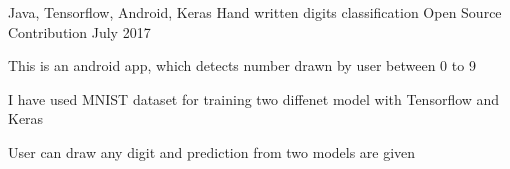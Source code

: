 \begin{cventries}
  \cventry
    {Java, Tensorflow, Android, Keras} %
    {Hand written digits classification} %
    {Open Source Contribution} %
    {July 2017} %
    {
      \begin{cvitems} %
        \item {This is an android app, which detects number drawn by user between 0 to 9}
        \item {I have used MNIST dataset for training two diffenet model with Tensorflow and Keras }
        \item {User can draw any digit and prediction from two models are given}
      \end{cvitems}
    }
   






\end{cventries}
